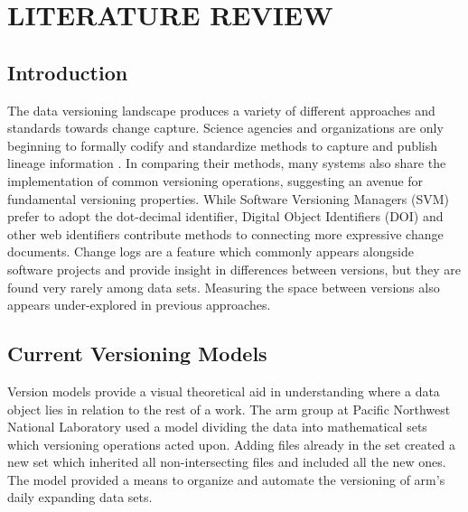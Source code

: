 
\chapter{LITERATURE REVIEW}\label{ch:prevwork}

\section{Introduction}

The data versioning landscape produces a variety of different approaches and standards towards change capture.
Science agencies and organizations are only beginning to formally codify and standardize methods to capture and publish lineage information \cite{MatthewS.Mayernik201312-039}.
In comparing their methods, many systems also share the implementation of common versioning operations, suggesting an avenue for fundamental versioning properties.
While Software Versioning Managers (SVM) prefer to adopt the dot-decimal identifier, Digital Object Identifiers (DOI) and other web identifiers contribute methods to connecting more expressive change documents.
Change logs are a feature which commonly appears alongside software projects and provide insight in differences between versions, but they are found very rarely among data sets.
Measuring the space between versions also appears under-explored in previous approaches.

\section{Current Versioning Models} \label{sec:models}

Version models provide a visual theoretical aid in understanding where a data object lies in relation to the rest of a work.
The \gls{arm} group at Pacific Northwest National Laboratory used a model dividing the data into mathematical sets which versioning operations acted upon\cite{6906868}.
Adding files already in the set created a new set which inherited all non-intersecting files and included all the new ones.
The model provided a means to organize and automate the versioning of \gls{arm}'s daily expanding data sets.

